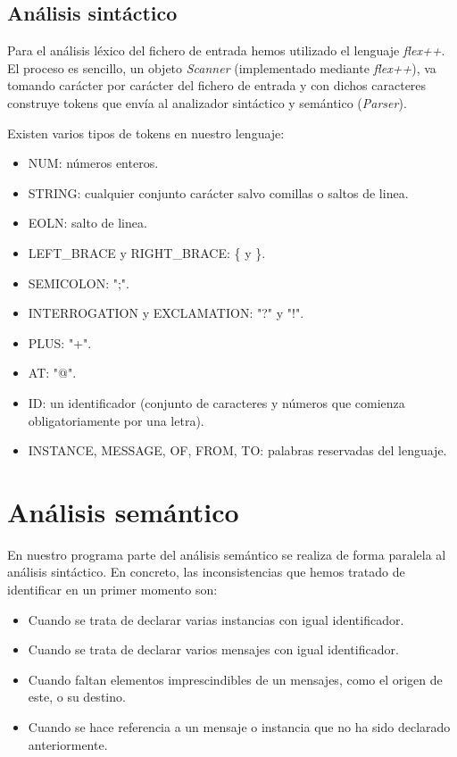 \documentclass[12pt,a4paper]{report}
\begin{document}
\subsection{Análisis sintáctico}

Para el análisis léxico del fichero de entrada hemos utilizado el lenguaje \textit{flex++}. El proceso es sencillo, un objeto \textit{Scanner} (implementado mediante \textit{flex++}), va tomando carácter por carácter del fichero de entrada y con dichos caracteres construye tokens que envía al analizador sintáctico y semántico (\textit{Parser}). 

Existen varios tipos de tokens en nuestro lenguaje:

\begin{itemize}
\item NUM: números enteros.
\item STRING: cualquier conjunto carácter salvo comillas o saltos de linea.
\item EOLN: salto de linea.
\item LEFT\_BRACE y RIGHT\_BRACE: \{ y \}.
\item SEMICOLON: ";".
\item INTERROGATION y EXCLAMATION: "?" y "!".
\item PLUS: "+".
\item AT: "@".
\item ID: un identificador (conjunto de caracteres y números que comienza obligatoriamente por una letra).
\item INSTANCE, MESSAGE, OF, FROM, TO: palabras reservadas del lenguaje.
\end{itemize}

\section{Análisis semántico}

En nuestro programa parte del análisis semántico se realiza de forma paralela al análisis sintáctico. En concreto, las inconsistencias que hemos tratado de identificar en un primer momento son:
\begin{itemize}
\item Cuando se trata de declarar varias instancias con igual identificador.
\item Cuando se trata de declarar varios mensajes con igual identificador.
\item Cuando faltan elementos imprescindibles de un mensajes, como el origen de este, o su destino.
\item Cuando se hace referencia a un mensaje o instancia que no ha sido declarado anteriormente.
\end{itemize}
\end{document}
